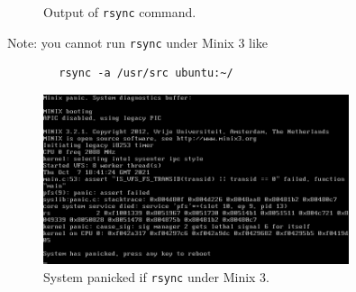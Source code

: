\documentclass[a4paper]{article}
\begin{document}
\begin{itemize}
\begin{figure}[H]
        \caption{Output of \texttt{rsync} command.}
    \end{figure}
    Note: you cannot run \texttt{rsync} under Minix 3 like
    \begin{verbatim}
        rsync -a /usr/src ubuntu:~/
    \end{verbatim}
    \begin{figure}[H]
        \centering
        \includegraphics[width=0.8\textwidth]{2.png}
        \caption{System panicked if \texttt{rsync} under Minix 3.}
    \end{figure}
\end{itemize}
\end{document}
